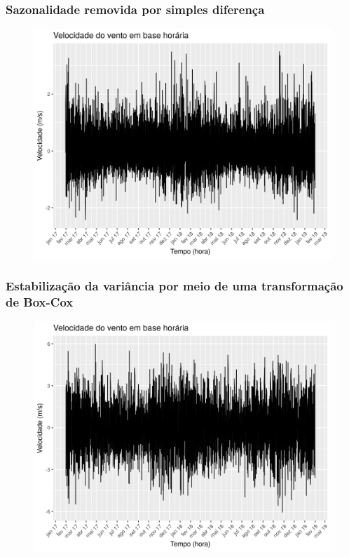 \documentclass[mathserif,serif]{beamer}
\begin{document}
\begin{frame}
	\frametitle{Sazonalidade removida por simples diferença}
	\begin{figure}
		\centering
		\includegraphics[scale=0.6]{entire_series_hourly_basis_seasonless.png}
	\end{figure}
\end{frame}

\begin{frame}
	\frametitle{Estabilização da variância por meio de uma transformação de Box-Cox}
	\begin{figure}
		\centering
		\includegraphics[scale=0.55]{entire_series_hourly_basis_seasonless_boxcox.png}
	\end{figure}
\end{frame}
\end{document}

